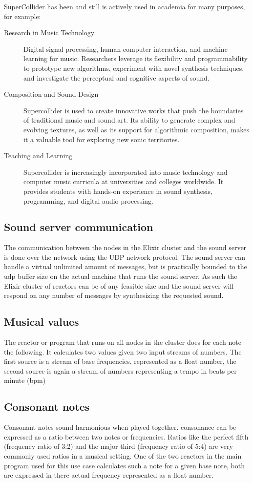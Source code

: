 \documentclass[a4paper]{book}
\begin{document}
SuperCollider has been and still is actively used in academia for many purposes, for example:
\begin{description}
	\item[Research in Music Technology] Digital signal processing, human-computer interaction, and machine learning for music. Researchers leverage its flexibility and programmability to prototype new algorithms, experiment with novel synthesis techniques, and investigate the perceptual and cognitive aspects of sound.
	\item[Composition and Sound Design] Supercollider is used to create innovative works that push the boundaries of traditional music and sound art. Its ability to generate complex and evolving textures, as well as its support for algorithmic composition, makes it a valuable tool for exploring new sonic territories.
	\item[Teaching and Learning] Supercollider is increasingly incorporated into music technology and computer music curricula at universities and colleges worldwide. It provides students with hands-on experience in sound synthesis, programming, and digital audio processing.

\end{description} 
\subsection{Sound server communication}
The communication between the nodes in the Elixir cluster and the sound server is done over the network using the UDP network protocol. The sound server can handle a virtual unlimited amount of messages, but is practically bounded to the udp buffer size on the actual machine that runs the sound server. As such the Elixir cluster of reactors can be of any feasible size and the sound server will respond on any number of messages by synthesizing the requested sound. 

\subsection{Musical values}
The reactor or program that runs on all nodes in the cluster does for each note the following. It calculates two values given two input streams of numbers. The first source is a stream of base frequencies, represented as a float number, the second source is again a stream of numbers representing a tempo in beats per minute (bpm)

\subsection*{Consonant notes}
Consonant notes sound harmonious when played together. consonance can be expressed as a ratio between two notes or frequencies. Ratios like the perfect fifth (frequency ratio of 3:2) and the major third (frequency ratio of 5:4) are very commonly used ratios in a musical setting. One of the two reactors in the main program used for this use case calculates such a note for a given base note, both are expressed in there actual frequency represented as a float number.
\end{document}
